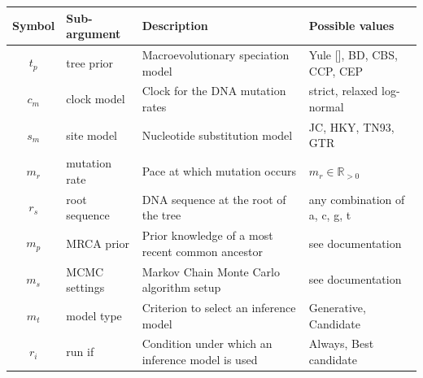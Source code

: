 \documentclass{article}
\begin{document}
\begin{table}
\centering
  \begin{tabular}{|@{}c|p{2.5cm}|p{9cm}|p{4.5cm}@{}|}
    \hline
    \centering
    \textbf{Symbol} & \textbf{Sub-argument} & \textbf{Description} 
      & \textbf{Possible values} \\ 
    \hline
    $\mathit{t_{p}}$ & tree prior & Macroevolutionary speciation model 
      & Yule [\cite{yule}], BD, CBS, CCP, CEP \\
    $\mathit{c_{m}}$ & clock model & Clock for the DNA mutation rates 
      & strict, relaxed log-normal \\
    $\mathit{s_{m}}$ & site model & Nucleotide substitution model 
      & JC, HKY, TN93, GTR \\
    $\mathit{m_{r}}$ & mutation rate & Pace at which mutation occurs 
      & $m_{r} \in \mathbb{R}_{>0}$\\
    $\mathit{r_{s}}$ & root sequence & DNA sequence at the root of the tree 
      & any combination of a, c, g, t \\
    $\mathit{m_{p}}$ & MRCA prior & Prior knowledge of a most recent common 
      ancestor & see documentation \\
    $\mathit{m_{s}}$ & MCMC settings & Markov Chain Monte Carlo algorithm setup 
      & see documentation \\
    $\mathit{m_{t}}$ & model type & Criterion to select an inference model 
      & Generative, Candidate \\
    $\mathit{r_{i}}$ & run if & Condition under which an inference model is 
      used & Always, Best candidate\\

\end{tabular}
\end{table}
\end{document}
